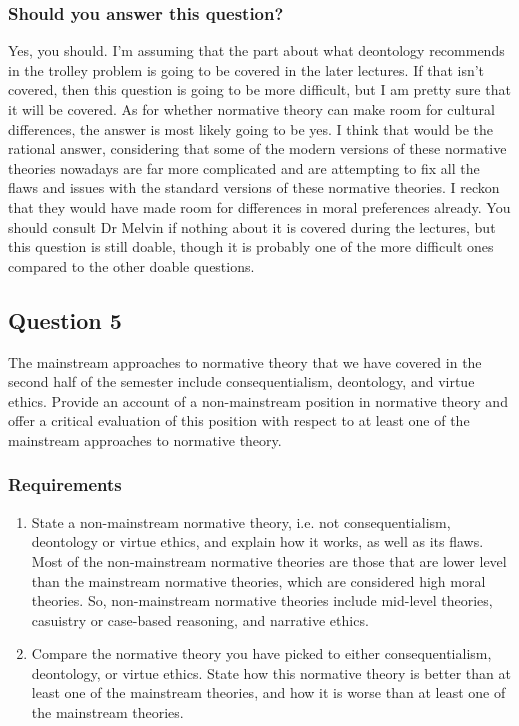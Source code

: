 \documentclass[11pt]{article}
\begin{document}
 \newpage
\subsubsection{Should you answer this question?}
\label{sec:org0633373}
Yes, you should. I'm assuming that the part about what deontology recommends in the trolley problem is going to be covered in the later lectures. If that isn't covered, then this question is going to be more difficult, but I am pretty sure that it will be covered. As for whether normative theory can make room for cultural differences, the answer is most likely going to be yes. I think that would be the rational answer, considering that some of the modern versions of these normative theories nowadays are far more complicated and are attempting to fix all the flaws and issues with the standard versions of these normative theories. I reckon that they would have made room for differences in moral preferences already. You should consult Dr Melvin if nothing about it is covered during the lectures, but this question is still doable, though it is probably one of the more difficult ones compared to the other doable questions.

 \newpage
\subsection{Question 5}
\label{sec:orgca26d54}
The mainstream approaches to normative theory that we have covered in the second half of the semester include consequentialism, deontology, and virtue ethics. Provide an account of a non-mainstream position in normative theory and offer a critical evaluation of this position with respect to at least one of the mainstream approaches to normative theory.
\subsubsection{Requirements}
\label{sec:org287ec59}
\begin{enumerate}
\item State a non-mainstream normative theory, i.e. not consequentialism, deontology or virtue ethics, and explain how it works, as well as its flaws. Most of the non-mainstream normative theories are those that are lower level than the mainstream normative theories, which are considered high moral theories. So, non-mainstream normative theories include mid-level theories, casuistry or case-based reasoning, and narrative ethics.
\item Compare the normative theory you have picked to either consequentialism, deontology, or virtue ethics. State how this normative theory is better than at least one of the mainstream theories, and how it is worse than at least one of the mainstream theories.
\end{enumerate}
\end{document}
